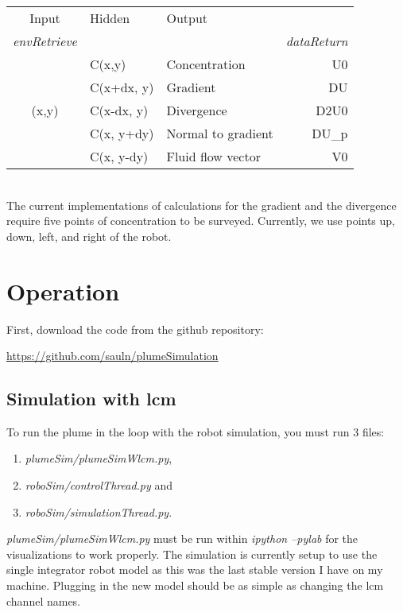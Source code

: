 \documentclass[11pt]{article} %
\begin{document}
\begin{tabular}{ c| l| l |r}
  Input& Hidden & Output&  \\

{\it envRetrieve}&&&{\it dataReturn} \\\hline
                     & C(x,y)         & Concentration  & U0 \\
                     & C(x+dx, y) & Gradient & DU\\
     (x,y)        & C(x-dx, y) &Divergence  & D2U0  \\
                     & C(x, y+dy) & Normal to gradient & DU\_p\\
                     & C(x, y-dy) & Fluid flow vector & V0 \\
\end{tabular}\\

The current implementations of calculations for the gradient and the divergence require five points of concentration to be surveyed.  Currently, we use points up, down, left, and right of the robot.  

\section{Operation}
First, download the code from the github repository: 
	\begin{center} \url{https://github.com/sauln/plumeSimulation  } \end{center}

\subsection{Simulation with lcm}

To run the plume in the loop with the robot simulation, you must run 3 files:
	\begin{enumerate}
	\item {\it plumeSim/plumeSimWlcm.py}, 
	\item {\it roboSim/controlThread.py} and 
	\item{\it roboSim/simulationThread.py}.
	\end{enumerate}

{\it  plumeSim/plumeSimWlcm.py} must be run within \emph{ipython --pylab} for the visualizations to work properly.  The simulation is currently setup to use the single integrator robot model as this was the last stable version I have on my machine.  Plugging in the new model should be as simple as changing the lcm channel names.
\end{document}
